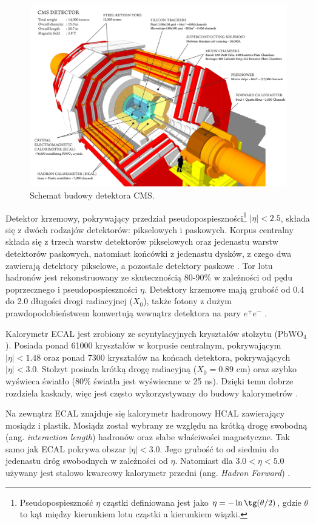 \documentclass{pracalicmgr}
\begin{document}
	\begin{figure}[H]
	\centering
	\includegraphics[width=1\textwidth]{cms.png}
	\caption{Schemat budowy detektora CMS.}
	\label{fig:cms}
	\end{figure}
	
	Detektor krzemowy, pokrywający przedział pseudopospieszności\footnote{Pseudopospieszność $\eta$ cząstki definiowana jest jako $\eta = -\ln \tg(\theta/2)$, gdzie $\theta$ to kąt między kierunkiem lotu cząstki a kierunkiem wiązki.} $|\eta| < 2.5$, składa się z dwóch rodzajów detektorów: pikselowych i paskowych. Korpus centralny składa się z trzech warstw detektorów pikselowych oraz jedenastu warstw detektorów paskowych, natomiast końcówki z jedenastu dysków, z czego dwa zawierają detektory pikselowe, a pozostałe detektory paskowe \cite{cms_technical}. Tor lotu hadronów jest rekonstruowany ze skutecznością 80-90\% w zależności od pędu poprzecznego i pseudopospieszności $\eta$. Detektory krzemowe mają grubość od 0.4 do 2.0 długości drogi radiacyjnej ($X_0$), także fotony z dużym prawdopodobieństwem konwertują wewnątrz detektora na pary $e^+e^-$ \cite{tauid13}.
	
	Kalorymetr ECAL jest zrobiony ze scyntylacyjnych kryształów stolzytu (PbWO$_4$). Posiada ponad 61000 kryształów w korpusie centralnym, pokrywającym $|\eta| < 1.48$ oraz ponad 7300 kryształów na końcach detektora, pokrywających $|\eta| < 3.0$. Stolzyt posiada krótką drogę radiacyjną ($X_0 = 0.89$ cm) oraz szybko wyświeca światło (80\% światła jest wyświecane w 25 ns). Dzięki temu dobrze rozdziela kaskady, więc jest często wykorzystywany do budowy kalorymetrów \cite{cms_technical}.
	
	Na zewnątrz ECAL znajduje się kalorymetr hadronowy HCAL zawierający mosiądz i plastik. Mosiądz został wybrany ze względu na krótką drogę swobodną (ang. \textit{interaction length}) hadronów oraz słabe właściwości magnetyczne.
Tak samo jak ECAL pokrywa obszar $|\eta| < 3.0$. Jego grubość to od siedmiu do jedenastu dróg swobodnych w zależności od $\eta$. Natomiast dla $3.0 < \eta < 5.0$ używany jest stalowo kwarcowy kalorymetr przedni (ang. \textit{Hadron Forward}) \cite{cms_technical}.
	
\end{document}
